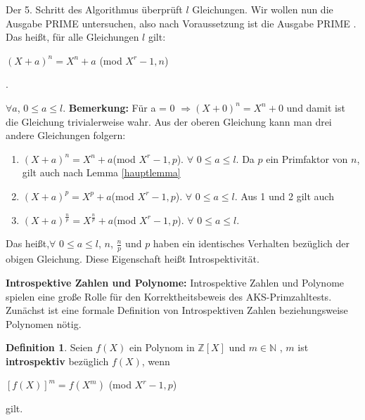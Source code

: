 \documentclass[12pt,oneside]{article}
\theoremstyle{remark}
\theoremstyle{definition}
\newtheorem{definition}{Definition}[section]
\begin{document}
Der 5. Schritt des Algorithmus überprüft $l$ Gleichungen. Wir wollen nun die Ausgabe PRIME untersuchen, also nach Voraussetzung ist die Ausgabe PRIME . Das heißt, für alle Gleichungen $l$ gilt:\newline\newline
\centerline{$(X + a)^n = X^n + a $ (mod $X^r - 1, n$)}.

$\forall a$, $ 0 \leq a \leq l$.\newline\newline
\textbf{Bemerkung:} Für a = 0 $\Rightarrow (X + 0)^n = X^n + 0$ und damit ist die Gleichung trivialerweise wahr.\newline\newline 
Aus der oberen Gleichung kann man drei andere Gleichungen folgern:
\begin{enumerate}
    \item $(X + a)^n = X^n + a $(mod $X^r - 1, p$).
$\forall$ $ 0 \leq a \leq l$.\newline\newline  
Da $p$ ein Primfaktor von $n$, gilt auch nach Lemma \ref{hauptlemma} \newline
\item $(X + a)^p = X^p + a $(mod $X^r - 1, p$).
$\forall$ $0 \leq a \leq l$.\newline\newline
Aus 1 und 2 gilt auch\newline
\item $(X + a)^{\frac{n}{p}} = X^{\frac{n}{p}} + a $(mod $X^r - 1, p$).
$\forall$ $0 \leq a \leq l$.\newline\newline
\end{enumerate}

Das heißt,$\forall$ $0 \leq a \leq l$, $n$, $\frac{n}{p}$ und $p$ haben ein identisches Verhalten bezüglich der obigen Gleichung. Diese Eigenschaft heißt Introspektivität.\newline    


\textbf{Introspektive Zahlen und Polynome:}
Introspektive Zahlen und Polynome spielen eine große Rolle für den Korrektheitsbeweis des AKS-Primzahltests. Zunächst ist eine formale Definition von Introspektiven Zahlen beziehungsweise Polynomen nötig.

\begin{definition}
Seien $f(X)$ ein Polynom in $\mathbb{Z}[X]$ und $m \in \mathbb{N}$ , $m$ ist \textbf{introspektiv} bezüglich $f(X)$, wenn\newline\newline
    \centerline{$[f(X)]^{m} = f(X^m)$ (mod $X^r - 1,p$)} 
gilt. 
\end{definition}
\end{document}
